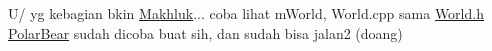 U/ yg kebagian bkin \hyperlink{class_makhluk}{Makhluk}... coba lihat m\+World, World.\+cpp sama \hyperlink{_world_8h_source}{World.\+h} \hyperlink{class_polar_bear}{Polar\+Bear} sudah dicoba buat sih, dan sudah bisa jalan2 (doang) 